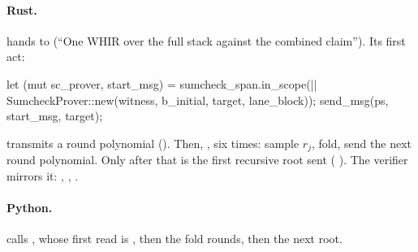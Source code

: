 \begin{sloppypar}
\paragraph{Rust.}  hands  to
 (``One WHIR over the full stack against the combined claim'').
Its first act:
\end{sloppypar}

\begin{srccode}
    let (mut sc_prover, start_msg) =
        sumcheck_span.in_scope(|| SumcheckProver::new(witness, b_initial, target, lane_block));
    send_msg(ps, start_msg, target);
\end{srccode}

\begin{sloppypar}
 transmits a round polynomial (). Then, ,
six times: sample $r_j$, fold, send the next round polynomial. Only after that is the first
recursive root sent ( ). The verifier mirrors
it:  ,
 ,  .

\paragraph{Python.}  calls ,
whose first read is  ,
then  the fold rounds, then  the next root.
\end{sloppypar}


